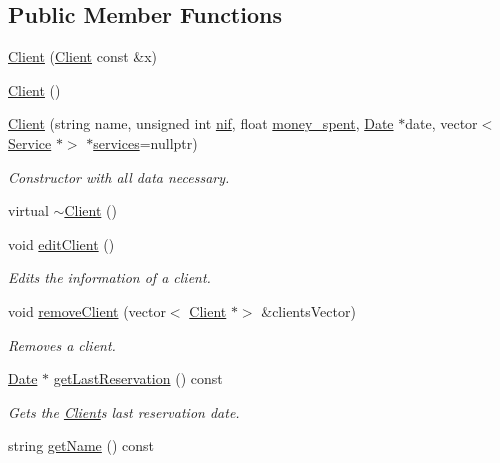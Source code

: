 \subsection*{Public Member Functions}
\begin{DoxyCompactItemize}
\item 
\hyperlink{class_client_ab3079953a67493b5da6ffb32d4f14ac7}{Client} (\hyperlink{class_client}{Client} const \&x)
\item 
\hyperlink{class_client_ae51af7aa6b8f591496a8f6a4a87a14bf}{Client} ()
\item 
\hyperlink{class_client_a3181be5da28eead3b40eb73f05490666}{Client} (string name, unsigned int \hyperlink{class_client_a1c94dc96a56cb5032573fb1d528517c2}{nif}, float \hyperlink{class_client_a9d5dc70a6eee2fded8217a7983fe5fd0}{money\+\_\+spent}, \hyperlink{class_date}{Date} $\ast$date, vector$<$ \hyperlink{class_service}{Service} $\ast$$>$ $\ast$\hyperlink{class_client_a02b601f12b9905edae7e64ded9bde912}{services}=nullptr)
\begin{DoxyCompactList}\small\item\em Constructor with all data necessary. \end{DoxyCompactList}\item 
virtual \hyperlink{class_client_a840e519ca781888cbd54181572ebe3a7}{$\sim$\+Client} ()
\item 
void \hyperlink{class_client_afe8b004559fd1480fb8747c352f167db}{edit\+Client} ()
\begin{DoxyCompactList}\small\item\em Edits the information of a client. \end{DoxyCompactList}\item 
void \hyperlink{class_client_a7f845c33f4aa7b7081ae72d9a16c2d3f}{remove\+Client} (vector$<$ \hyperlink{class_client}{Client} $\ast$$>$ \&clients\+Vector)
\begin{DoxyCompactList}\small\item\em Removes a client. \end{DoxyCompactList}\item 
\hyperlink{class_date}{Date} $\ast$ \hyperlink{class_client_a271a8c69a39636c6a4f40fd6653b5465}{get\+Last\+Reservation} () const
\begin{DoxyCompactList}\small\item\em Gets the \hyperlink{class_client}{Client}\textquotesingle{}s last reservation date. \end{DoxyCompactList}\item 
string \hyperlink{class_client_a5c473ba52d7678744edec9e51052c947}{get\+Name} () const

\end{DoxyCompactItemize}
